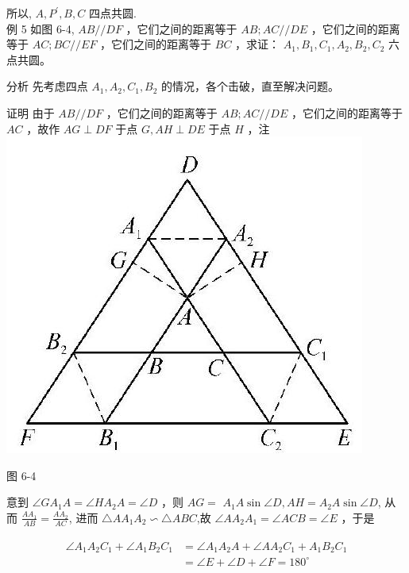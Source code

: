 \documentclass[10pt]{article}
\begin{document}
所以, $A, P^{\prime}, B, C$ 四点共圆.\\
例 5 如图 6-4, $A B / / D F$ ，它们之间的距离等于 $A B ; A C / / D E$ ，它们之间的距离等于 $A C ; B C / / E F$ ，它们之间的距离等于 $B C$ ，求证： $A_{1}, B_{1}, C_{1}, A_{2}, B_{2}, C_{2}$ 六点共圆。

分析 先考虑四点 $A_{1}, A_{2}, C_{1}, B_{2}$ 的情况，各个击破，直至解决问题。

证明 由于 $A B / / D F$ ，它们之间的距离等于 $A B ; A C / / D E$ ，它们之间的距离等于 $A C$ ，故作 $A G \perp D F$ 于点 $G, A H \perp D E$ 于点 $H$ ，注\\
\includegraphics[max width=\textwidth, center]{2024_10_30_66b8e5e701da2093c133g-045(1)}

图 6-4

意到 $\angle G A_{1} A=\angle H A_{2} A=\angle D$ ，则 $A G=$ $A_{1} A \sin \angle D, A H=A_{2} A \sin \angle D$, 从而 $\frac{A A_{1}}{A B}=\frac{A A_{2}}{A C}$, 进而 $\triangle A A_{1} A_{2} \backsim \triangle A B C$,故 $\angle A A_{2} A_{1}=\angle A C B=\angle E$ ，于是

\begin{align*}
\begin{aligned}
\angle A_{1} A_{2} C_{1}+\angle A_{1} B_{2} C_{1} & =\angle A_{1} A_{2} A+\angle A A_{2} C_{1}+A_{1} B_{2} C_{1} \\
& =\angle E+\angle D+\angle F=180^{\circ}
\end{aligned}
\end{align*}
\end{document}
